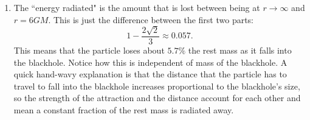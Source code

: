 \documentclass[11pt]{article}
\begin{document}
\begin{enumerate}[label=\alph*)]
\item The ``energy radiated" is the amount that is lost between being at $r \rightarrow \infty$ and $r = 6GM$. This is just the difference between the first two parts:
\[1 - \frac{2\sqrt{2}}{3} \approx 0.057 .\]
This means that the particle loses about $\boxed{5.7 \%}$ the rest mass as it falls into the blackhole. Notice how this is independent of mass of the blackhole. A quick hand-wavy explanation is that the distance that the particle has to travel to fall into the blackhole increases proportional to the blackhole's size, so the strength of the attraction and the distance account for each other and mean a constant fraction of the rest mass is radiated away.

\end{enumerate}
\end{document}
